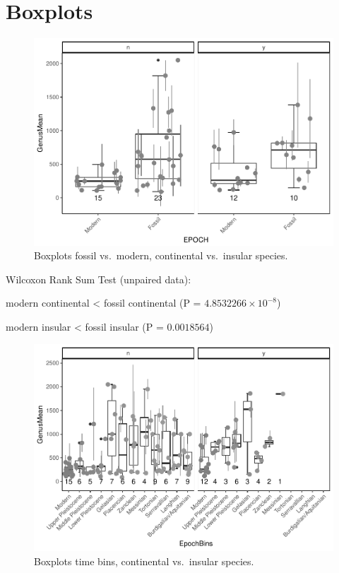 \section{Boxplots}


\begin{figure}[htbp]
	\centering
	\includegraphics{MA_JJ_files/figure-latex/BPFMCI-1.pdf}
	\caption{Boxplots fossil vs.~modern, continental vs.~insular species.}
	\label{BoxFoMCI}
\end{figure}


Wilcoxon Rank Sum Test (unpaired data):

modern continental \textless{} fossil continental (P =
\(4.8532266\times 10^{-8}\))

modern insular \textless{} fossil insular (P = \(0.0018564\))


\begin{figure}[htbp]
	\centering
	\includegraphics{MA_JJ_files/figure-latex/Box_FM_timebin.pdf}
	\caption{Boxplots time bins, continental vs.~insular species.}
	\label{BoxTBCI}
\end{figure}


